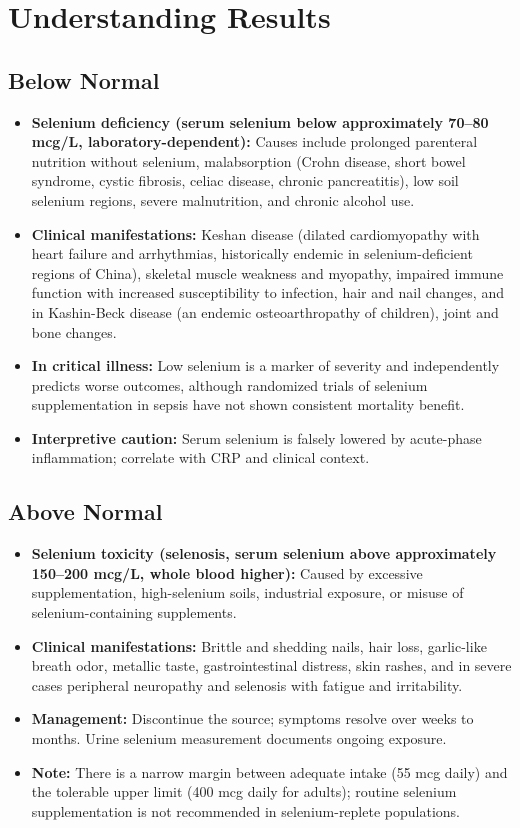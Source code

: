 \section*{Understanding Results}

\subsection*{Below Normal}
\begin{itemize}
  \item \textbf{Selenium deficiency (serum selenium below approximately 70--80 mcg/L, laboratory-dependent):} Causes include prolonged parenteral nutrition without selenium, malabsorption (Crohn disease, short bowel syndrome, cystic fibrosis, celiac disease, chronic pancreatitis), low soil selenium regions, severe malnutrition, and chronic alcohol use.
  \item \textbf{Clinical manifestations:} Keshan disease (dilated cardiomyopathy with heart failure and arrhythmias, historically endemic in selenium-deficient regions of China), skeletal muscle weakness and myopathy, impaired immune function with increased susceptibility to infection, hair and nail changes, and in Kashin-Beck disease (an endemic osteoarthropathy of children), joint and bone changes.
  \item \textbf{In critical illness:} Low selenium is a marker of severity and independently predicts worse outcomes, although randomized trials of selenium supplementation in sepsis have not shown consistent mortality benefit.
  \item \textbf{Interpretive caution:} Serum selenium is falsely lowered by acute-phase inflammation; correlate with CRP and clinical context.
\end{itemize}

\subsection*{Above Normal}
\begin{itemize}
  \item \textbf{Selenium toxicity (selenosis, serum selenium above approximately 150--200 mcg/L, whole blood higher):} Caused by excessive supplementation, high-selenium soils, industrial exposure, or misuse of selenium-containing supplements.
  \item \textbf{Clinical manifestations:} Brittle and shedding nails, hair loss, garlic-like breath odor, metallic taste, gastrointestinal distress, skin rashes, and in severe cases peripheral neuropathy and selenosis with fatigue and irritability.
  \item \textbf{Management:} Discontinue the source; symptoms resolve over weeks to months. Urine selenium measurement documents ongoing exposure.
  \item \textbf{Note:} There is a narrow margin between adequate intake (55 mcg daily) and the tolerable upper limit (400 mcg daily for adults); routine selenium supplementation is not recommended in selenium-replete populations.
\end{itemize}


